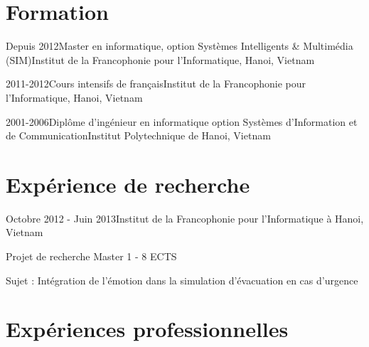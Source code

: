 \documentclass[a4paper,11pt]{article}
\begin{document}
\maketitle
\section{Formation}
\begin{itemFormation}{Depuis 2012}{Master en informatique, option Systèmes Intelligents 
\& Multimédia (SIM)}{Institut de la Francophonie pour l'Informatique, Hanoi, Vietnam}
\end{itemFormation}

\begin{itemFormation}{2011-2012}{Cours intensifs de français}{Institut de la Francophonie 
pour l'Informatique, Hanoi, Vietnam}
\end{itemFormation}

\begin{itemFormation2}{2001-2006}{Diplôme d'ingénieur en informatique}
{option Systèmes d'Information et de Communication}{Institut Polytechnique de Hanoi, Vietnam}
\end{itemFormation2} %

\section{Expérience de recherche}
\begin{itemRecherche} {Octobre 2012 - Juin 2013}{Institut de la Francophonie pour l'Informatique à Hanoi, Vietnam}
\item Projet de recherche Master 1 - 8 ECTS
\item[] Sujet : Intégration de l’émotion dans la simulation d’évacuation en cas d’urgence
\end{itemRecherche}

\section{Expériences professionnelles}
\end{document}

